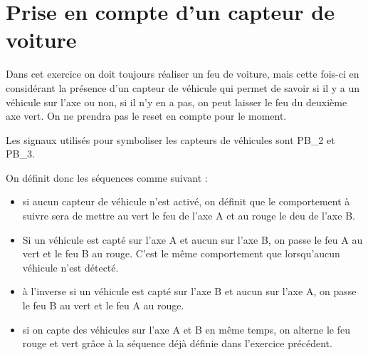\documentclass[11pt]{report}
\begin{document}
\section{Prise en compte d'un capteur de voiture}


Dans cet exercice on doit toujours réaliser un feu de voiture, mais cette fois-ci en considérant la présence d'un capteur de véhicule qui permet de savoir si il y a un véhicule sur l'axe ou non, si il n'y en a pas, on peut laisser le feu du deuxième axe vert. On ne prendra pas le reset en compte pour le moment.

Les signaux utilisés pour symboliser les capteurs de véhicules sont PB\_2 et PB\_3.

On définit donc les séquences comme suivant :
\begin{itemize}
	\item si aucun capteur de véhicule n'est activé, on définit que le comportement à suivre sera de mettre au vert le feu de l'axe A et au rouge le deu de l'axe B.
	\item Si un véhicule est capté sur l'axe A et aucun sur l'axe B, on passe le feu A au vert et le feu B au rouge. C'est le même comportement que lorsqu'aucun véhicule n'est détecté.
	\item à l'inverse si un véhicule est capté sur l'axe B et aucun sur l'axe A, on passe le feu B au vert et le feu A au rouge.
	\item si on capte des véhicules sur l'axe A et B en même temps, on alterne le feu rouge et vert grâce à la séquence déjà définie dans l'exercice précédent.


\end{itemize}
\end{document}
